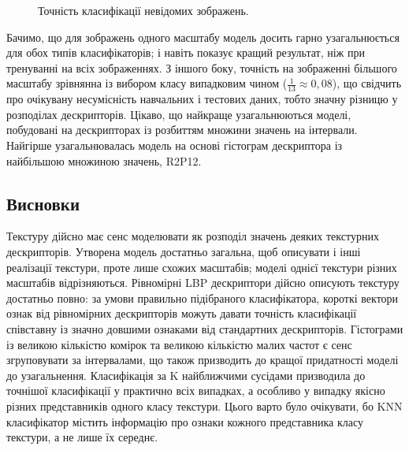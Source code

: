 \begin{figure}[h]
    \caption{Точність класифікації невідомих зображень.}
    \label{fig:precision-3}
\end{figure}

Бачимо, що для зображень одного масштабу модель досить гарно узагальнюється для обох типів класифікаторів; 
і навіть показує кращий результат, ніж при тренуванні на всіх зображеннях.
З іншого боку, точність на зображенні більшого масштабу зрівнянна із вибором класу випадковим чином ($\frac{1}{13} \approx 0{,}08$), 
що свідчить про очікувану несумісність навчальних і тестових даних, тобто значну різницю у розподілах дескрипторів.
Цікаво, що найкраще узагальнюються моделі, побудовані на дескрипторах із розбиттям множини значень на інтервали.
Найгірше узагальнювалась модель на основі гістограм дескриптора із найбільшою множиною значень, R2P12.



\subsection{Висновки}\label{section2.1f}\hfill

Текстуру дійсно має сенс моделювати як розподіл значень деяких текстурних дескрипторів.
Утворена модель достатньо загальна, щоб описувати і інші реалізації текстури, проте лише схожих масштабів; 
моделі однієї текстури різних масштабів відрізняються.
Рівномірні LBP дескриптори дійсно описують текстуру достатньо повно: за умови правильно підібраного класифікатора, короткі вектори ознак від рівномірних дескрипторів можуть давати точність класифікації 
співставну із значно довшими ознаками від стандартних дескрипторів. 
Гістограми із великою кількістю комірок та великою кількістю малих частот є сенс згруповувати за інтервалами, що також призводить до кращої придатності моделі до узагальнення.
Класифікація за K найближчими сусідами призводила до точнішої класифікації у практично всіх випадках, а особливо у випадку якісно різних представників одного класу текстури.
Цього варто було очікувати, бо KNN класифікатор містить інформацію про ознаки кожного представника класу текстури, а не лише їх середнє.